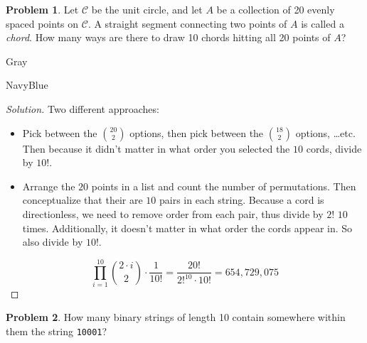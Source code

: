 \documentclass[12pt]{amsart}
\newcounter{problem_number}[section]
\theoremstyle{named}
\newenvironment{soln}
{\begin{color}{Gray}\begin{framed}\begin{color}{NavyBlue}\begin{proof}[Solution]
\doublespacing}
{\end{proof}\end{color}\end{framed}\end{color}}
\theoremstyle{definition}
\newtheorem{problem}{Problem}
\begin{document}
\begin{problem}
	Let $\mathcal C$ be the unit circle, and let $A$ be a collection of 20 evenly spaced points on $\mathcal C$.
	A straight segment connecting two points of $A$ is called a \emph{chord}.
	How many ways are there to draw 10 chords hitting all 20 points of $A$?
\end{problem}

\begin{soln}
    \phantom{ }

	Two different approaches:

	\begin{itemize}
		\item Pick between the $\displaystyle {20 \choose 2}$ options,
		then pick between the $\displaystyle {18 \choose 2}$ options, \dots etc.
		Then because it didn't matter in what order you selected the $10$ cords, divide
		by $10!$. 
		\item Arrange the $20$ points in a list and count the number of
		permutations. Then conceptualize that their are $10$ pairs in each
		string. Because a cord is directionless, we need to remove order 
		from each pair, thus divide by $2!$ $10$ times. Additionally, it doesn't
		matter in what order the cords appear in. So also divide by $10!$. 
	\end{itemize}

	$$\displaystyle\prod_{i=1}^{10}{2\cdot i \choose 2} \cdot \frac{1}{10!} = 
	\frac{20!}{2!^{10}\cdot10!}= 654,729,075$$

\end{soln}

\begin{problem}
	How many binary strings of length 10 contain somewhere within them the string \verb|10001|?
\end{problem}
\end{document}

